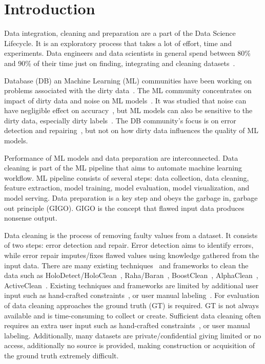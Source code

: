 \chapter{Introduction}
Data integration, cleaning and preparation are a part of the Data Science Lifecycle. It is an exploratory process that takes a lot of effort, time and experiments.
Data engineers and data scientists in general spend between 80\% and 90\% of their time just on finding, integrating and cleaning datasets~\cite{80cleansurvey, dataintegration80}.

Database (DB) an Machine Learning (ML) communities have been working on problems associated with the dirty data~\cite{cleanml}. 
The ML community concentrates on impact of dirty data and noise on ML models~\cite{cleanml}.
It was studied that noise can have negligible effect on accuracy~\cite{processingsys, outperformstudy}, but ML models can also be sensitive to the dirty data, especially dirty labels~\cite{classificationnoisesurvey}.
The DB community's focus is on error detection and repairing~\cite{Hellerstein08quantitativedata, duplicatesstudy}, but not on how dirty data influences the quality of ML models. 

Performance of ML models and data preparation are interconnected.
Data cleaning is part of the ML pipeline that aims to automate machine learning workflow. 
ML pipeline consists of several steps: data collection, data cleaning, feature extraction, model training, model evaluation, model visualization, and model serving.
Data preparation is a key step and obeys the garbage in, garbage out principle (GIGO).
GIGO is the concept that flawed input data produces nonsense output.

Data cleaning is the process of removing faulty values from a dataset.
It consists of two steps: error detection and repair.
Error detection aims to identify errors, while error repair imputes/fixes flawed values using knowledge gathered from the input data. 
There are many existing techniques~\cite{duplicatesstudy, tdeexcel} and frameworks to clean the data such as HoloDetect/HoloClean~\cite{holoclean, holodetect}, Raha/Baran~\cite{raha, baran}, BoostClean~\cite{boostclean}, AlphaClean~\cite{alphaclean}, ActiveClean~\cite{activeclean}. 
Existing techniques and frameworks are limited by additional user input such as hand-crafted constraints~\cite{bart}, or user manual labeling~\cite{raha, baran}.
For evaluation of data cleaning approaches the ground truth (GT) is required.
GT is not always available and is time-consuming to collect or create.
Sufficient data cleaning often requires an extra user input such as hand-crafted constraints~\cite{bart}, or user manual labeling.
Additionally, many datasets are private/confidential giving limited or no access, additionally no source is provided, making construction or acquisition of the ground truth extremely difficult. 

